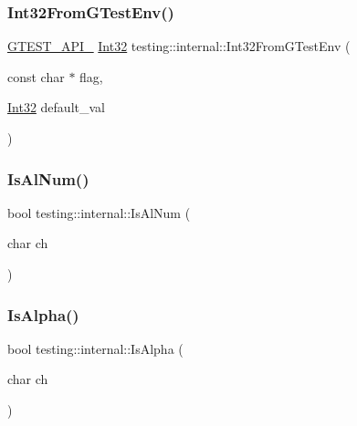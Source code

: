 \mbox{\label{namespacetesting_1_1internal_a227ce16736a6992fcd13ac3cd23ef1f1}} 
\subsubsection{\texorpdfstring{Int32\+From\+G\+Test\+Env()}{Int32FromGTestEnv()}}
{\footnotesize\ttfamily \hyperlink{gtest-port_8h_aa73be6f0ba4a7456180a94904ce17790}{G\+T\+E\+S\+T\+\_\+\+A\+P\+I\+\_\+} \hyperlink{namespacetesting_1_1internal_a8ee38faaf875f133358abaf9bc056cec}{Int32} testing\+::internal\+::\+Int32\+From\+G\+Test\+Env (\begin{DoxyParamCaption}\item[{const char $\ast$}]{flag,  }\item[{\hyperlink{namespacetesting_1_1internal_a8ee38faaf875f133358abaf9bc056cec}{Int32}}]{default\+\_\+val }\end{DoxyParamCaption})}

\mbox{\label{namespacetesting_1_1internal_a83802e7f23324cd512232203662e1a98}} 
\subsubsection{\texorpdfstring{Is\+Al\+Num()}{IsAlNum()}}
{\footnotesize\ttfamily bool testing\+::internal\+::\+Is\+Al\+Num (\begin{DoxyParamCaption}\item[{char}]{ch }\end{DoxyParamCaption})\hspace{0.3cm}{\ttfamily [inline]}}

\mbox{\label{namespacetesting_1_1internal_aeb957087fd6bbf9db98ab7cd41b0c129}} 
\subsubsection{\texorpdfstring{Is\+Alpha()}{IsAlpha()}}
{\footnotesize\ttfamily bool testing\+::internal\+::\+Is\+Alpha (\begin{DoxyParamCaption}\item[{char}]{ch }\end{DoxyParamCaption})\hspace{0.3cm}{\ttfamily [inline]}}

